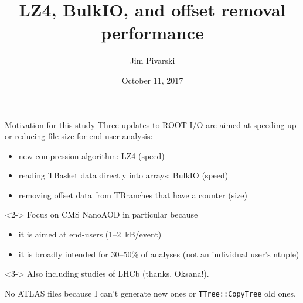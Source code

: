 \documentclass[aspectratio=169]{beamer}
\title[2017-10-11-rootioworkshop-lz4-bulkio-nanoaod]{LZ4, BulkIO, and offset removal performance}
\author{Jim Pivarski}
\institute{Princeton University -- DIANA}
\date{October 11, 2017}
\begin{document}

\begin{frame}
  \titlepage
\end{frame}




\begin{frame}{Motivation for this study}
\vspace{0.15 cm}
Three updates to ROOT I/O are aimed at speeding up or reducing file size for end-user analysis:
\begin{itemize}
\item new compression algorithm: LZ4 (speed)
\item reading TBasket data directly into arrays: BulkIO (speed)
\item removing offset data from TBranches that have a counter (size)
\end{itemize}

\vspace{0.5 cm}
\begin{uncoverenv}<2->
Focus on CMS NanoAOD in particular because
\begin{itemize}
\item it is aimed at end-users (1--2~kB/event)
\item it is broadly intended for 30--50\% of analyses (not an individual user's ntuple)
\end{itemize}
\end{uncoverenv}

\vspace{0.5 cm}
\begin{uncoverenv}<3->
Also including studies of LHCb (thanks, Oksana!).

\vspace{0.2 cm}
No ATLAS files because I can't generate new ones or {\tt TTree::CopyTree} old ones.
\end{uncoverenv}
\end{frame}
\end{document}
